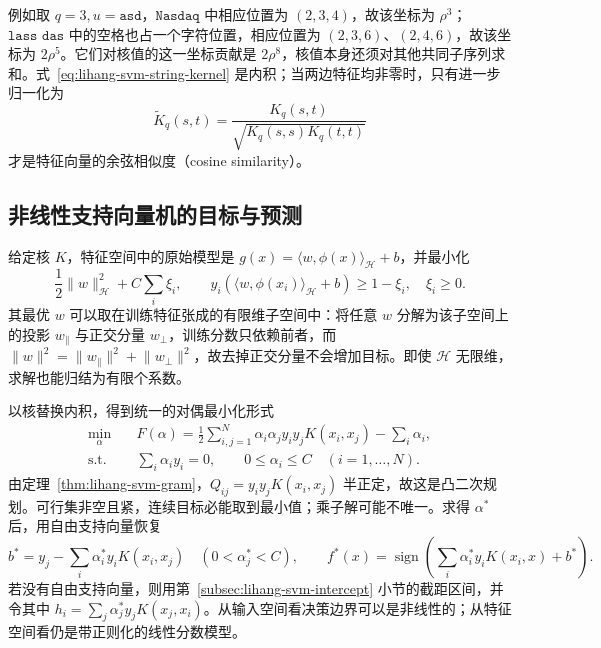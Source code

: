 例如取 $q=3,u=\texttt{asd}$，$\texttt{Nasdaq}$ 中相应位置为 $(2,3,4)$，故该坐标为 $\rho^3$；$\texttt{lass das}$ 中的空格也占一个字符位置，相应位置为 $(2,3,6)$、$(2,4,6)$，故该坐标为 $2\rho^5$。它们对核值的这一坐标贡献是 $2\rho^8$，核值本身还须对其他共同子序列求和。式~\eqref{eq:lihang-svm-string-kernel} 是内积；当两边特征均非零时，只有进一步归一化为
\[
  \widetilde K_q(s,t)
    =\frac{K_q(s,t)}{\sqrt{K_q(s,s)K_q(t,t)}}
\]
才是特征向量的余弦相似度（cosine similarity）。

\subsection{非线性支持向量机的目标与预测}

给定核 $K$，特征空间中的原始模型是 $g(x)=\langle w,\phi(x)\rangle_{\mathcal H}+b$，并最小化
\[
  \frac12\lVert w\rVert_{\mathcal H}^2+C\sum_i\xi_i,
  \qquad y_i(\langle w,\phi(x_i)\rangle_{\mathcal H}+b)\ge1-\xi_i,
  \quad\xi_i\ge0.
\]
其最优 $w$ 可以取在训练特征张成的有限维子空间中：将任意 $w$ 分解为该子空间上的投影 $w_{\parallel}$ 与正交分量 $w_{\perp}$，训练分数只依赖前者，而 $\lVert w\rVert^2=\lVert w_{\parallel}\rVert^2+\lVert w_{\perp}\rVert^2$，故去掉正交分量不会增加目标。即使 $\mathcal H$ 无限维，求解也能归结为有限个系数。

以核替换内积，得到统一的对偶最小化形式
\begin{equation}
  \begin{aligned}
    \min_\alpha\quad
      &F(\alpha)=\frac12\sum_{i,j=1}^{N}
          \alpha_i\alpha_j y_i y_j K(x_i,x_j)-\sum_i\alpha_i,\\
    \text{s.t.}\quad
      &\sum_i\alpha_i y_i=0,\qquad
       0\le\alpha_i\le C\quad(i=1,\ldots,N).
  \end{aligned}
  \label{eq:lihang-svm-kernel-dual}
\end{equation}
由定理~\ref{thm:lihang-svm-gram}，$Q_{ij}=y_i y_jK(x_i,x_j)$ 半正定，故这是凸二次规划。可行集非空且紧，连续目标必能取到最小值；乘子解可能不唯一。求得 $\alpha^*$ 后，用自由支持向量恢复
\begin{equation}
  b^*=y_j-\sum_i\alpha_i^*y_i K(x_i,x_j)
       \quad(0<\alpha_j^*<C),
  \qquad
  f^*(x)=\operatorname{sign}\left(\sum_i\alpha_i^*y_iK(x_i,x)+b^*\right).
  \label{eq:lihang-svm-kernel-prediction}
\end{equation}
若没有自由支持向量，则用第~\ref{subsec:lihang-svm-intercept} 小节的截距区间，并令其中 $h_i=\sum_j\alpha_j^*y_jK(x_j,x_i)$。从输入空间看决策边界可以是非线性的；从特征空间看仍是带正则化的线性分数模型。

